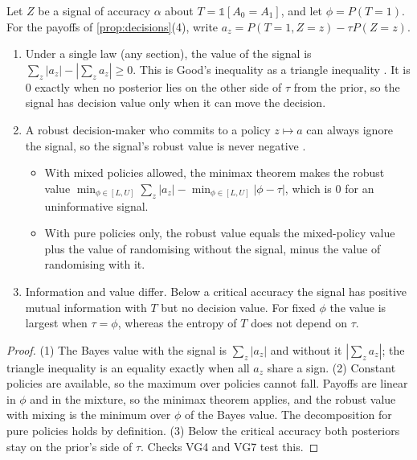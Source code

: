 \documentclass[11pt]{article}
\theoremstyle{definition}\newtheorem{definition}[theorem]{Definition}\newtheorem{remark}[theorem]{Remark}\newtheorem{example}[theorem]{Example}\newtheorem{problem}[theorem]{Open problem}\crefname{problem}{Problem}{Problems}
\begin{document}
\begin{proposition}\label{prop:instance}
Let $Z$ be a signal of accuracy $\alpha$ about $T=\mathbb 1[A_0=A_1]$, and let $\phi=P(T=1)$. For the payoffs of \cref{prop:decisions}(4), write $a_z=P(T=1,Z=z)-\tau P(Z=z)$.
\begin{enumerate}
\item[(1)] Under a single law (any section), the value of the signal is $\sum_z|a_z|-|\sum_za_z|\ge0$. This is Good's inequality as a triangle inequality \cite{Das2023}. It is $0$ exactly when no posterior lies on the other side of $\tau$ from the prior, so the signal has decision value only when it can move the decision.
\item[(2)] A robust decision-maker who commits to a policy $z\mapsto a$ can always ignore the signal, so the signal's robust value is never negative \cite{Iskandar2026}.
\begin{itemize}
\item With mixed policies allowed, the minimax theorem makes the robust value $\min_{\phi\in[L,U]}\sum_z|a_z|-\min_{\phi\in[L,U]}|\phi-\tau|$, which is $0$ for an uninformative signal.
\item With pure policies only, the robust value equals the mixed-policy value plus the value of randomising without the signal, minus the value of randomising with it.
\end{itemize}
\item[(3)] Information and value differ. Below a critical accuracy the signal has positive mutual information with $T$ but no decision value. For fixed $\phi$ the value is largest when $\tau=\phi$, whereas the entropy of $T$ does not depend on $\tau$.
\end{enumerate}
\end{proposition}

\begin{proof}
(1) The Bayes value with the signal is $\sum_z|a_z|$ and without it $|\sum_za_z|$; the triangle inequality is an equality exactly when all $a_z$ share a sign. (2) Constant policies are available, so the maximum over policies cannot fall. Payoffs are linear in $\phi$ and in the mixture, so the minimax theorem applies, and the robust value with mixing is the minimum over $\phi$ of the Bayes value. The decomposition for pure policies holds by definition. (3) Below the critical accuracy both posteriors stay on the prior's side of $\tau$. Checks VG4 and VG7 test this.
\end{proof}
\end{document}
